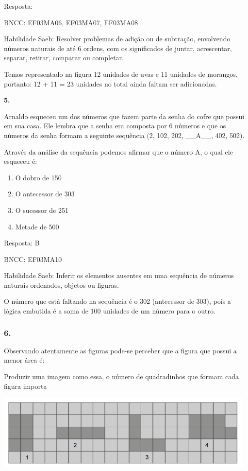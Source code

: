 Resposta:

BNCC: EF03MA06, EF03MA07, EF03MA08

Habilidade Saeb: Resolver problemas de adição ou de subtração,
envolvendo números naturais de até 6 ordens, com os significados de
juntar, acrescentar, separar, retirar, comparar ou completar.

Temos representado na figura 12 unidades de uvas e 11 unidades de
morangos, portanto: 12 + 11 = 23 unidades no total ainda faltam ser
adicionadas.

\textbf{5.}

Arnaldo esqueceu um dos números que fazem parte da senha do cofre que
possui em sua casa. Ele lembra que a senha era composta por 6 números e
que os números da senha formam a seguinte sequência (2, 102, 202,
\_\_A\_\_, 402, 502).

Através da análise da sequência podemos afirmar que o número A, o qual
ele esqueceu é:

\begin{enumerate}
\def\labelenumi{\alph{enumi})}
\item
  O dobro de 150
\item
  O antecessor de 303
\item
  O sucessor de 251
\item
  Metade de 500
\end{enumerate}

Resposta: B

BNCC: EF03MA10

Habilidade Saeb: Inferir os elementos ausentes em uma sequência de
números naturais ordenados, objetos ou figuras.

O número que está faltando na sequência é o 302 (antecessor de 303),
pois a lógica embutida é a soma de 100 unidades de um número para o
outro.

\subsubsection{6. }\label{section-175}

Observando atentamente as figuras pode-se perceber que a figura que
possui a menor área é:

Produzir uma imagem como essa, o número de quadradinhos que formam cada
figura importa

\includegraphics[width=5.12179in,height=1.48342in]{media/image133.png}


